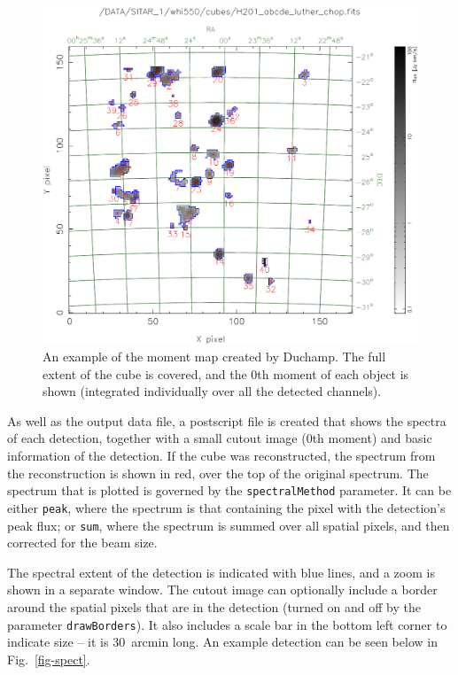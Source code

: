 \documentclass[12pt,a4paper]{article}
\begin{document}
\begin{figure}[!t]
\begin{center}
\includegraphics[width=\textwidth]{example_moment_map}
\end{center}
\caption{\footnotesize An example of the moment map created by
  Duchamp. The full extent of the cube is covered, and the 0th moment
  of each object is shown (integrated individually over all the
  detected channels).}
\label{fig-moment}
\end{figure}

As well as the output data file, a postscript file is created that
shows the spectra of each detection, together with a small cutout
image (0th moment) and basic information of the detection. If the cube
was reconstructed, the spectrum from the reconstruction is shown in
red, over the top of the original spectrum. The spectrum that is
plotted is governed by the {\tt spectralMethod} parameter. It can be
either {\tt peak}, where the spectrum is that containing the pixel
with the detection's peak flux; or {\tt sum}, where the spectrum is
summed over all spatial pixels, and then corrected for the beam size.

The spectral extent of the detection is indicated with blue lines, and
a zoom is shown in a separate window. The cutout image can optionally
include a border around the spatial pixels that are in the detection
(turned on and off by the parameter {\tt drawBorders}). It also
includes a scale bar in the bottom left corner to indicate size -- it
is 30~arcmin long. An example detection can be seen below in
Fig.~\ref{fig-spect}.
\end{document}
